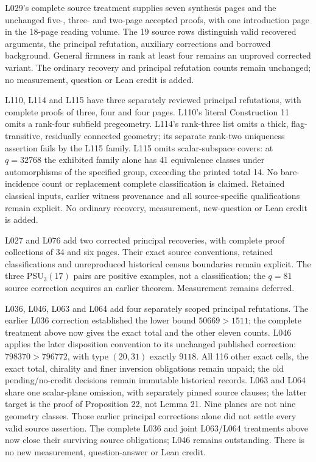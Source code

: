 \documentclass[11pt,a4paper]{article}
\begin{document}
L029's complete source treatment supplies seven synthesis
pages and the unchanged five-, three- and two-page accepted proofs,
with one introduction page in the 18-page reading volume. The 19 source
rows distinguish valid recovered arguments, the principal refutation,
auxiliary corrections and borrowed background. General firmness in rank
at least four remains an unproved corrected variant. The ordinary recovery
and principal refutation counts remain unchanged; no measurement, question
or Lean credit is added.

L110, L114 and L115 have three separately reviewed principal refutations,
with complete proofs of three, four and four pages. L110's literal
Construction 11 omits a rank-four subfield pregeometry. L114's rank-three
list omits a thick, flag-transitive, residually connected geometry; its
separate rank-two uniqueness assertion fails by the L115 family. L115
omits scalar-subspace covers: at $q=32768$ the exhibited family alone has
41 equivalence classes under automorphisms of the specified group,
exceeding the printed total 14. No bare-incidence count or replacement
complete classification is claimed. Retained classical inputs, earlier
witness provenance and all source-specific qualifications remain explicit.
No ordinary recovery, measurement, new-question or Lean credit is added.

L027 and L076 add two corrected principal recoveries, with complete
proof collections of 34 and six pages. Their exact source conventions,
retained classifications and unreproduced historical census boundaries
remain explicit. The three PSU$_3(17)$ pairs are positive examples, not a
classification; the $q=81$ source correction acquires an earlier theorem.
Measurement remains deferred.

L036, L046, L063 and L064 add four separately scoped principal refutations.
The earlier L036 correction established the lower bound $50669>1511$;
the complete treatment above now gives the exact total and the other
eleven counts.
L046 applies the later disposition convention to its unchanged published
correction: $798370>796772$, with type $(20,31)$ exactly $9118$.
All 116 other exact cells, the exact total, chirality and finer inversion
obligations remain unpaid; the old pending/no-credit decisions remain
immutable historical records. L063 and L064 share one scalar-plane omission,
with separately pinned source clauses; the latter target is the proof of
Proposition 22, not Lemma 21. Nine planes are not nine geometry classes.
Those earlier principal corrections alone did not settle every valid source
assertion. The complete L036 and joint L063/L064 treatments above now close
their surviving source obligations; L046 remains outstanding. There is no new measurement,
question-answer or Lean credit.
\end{document}

